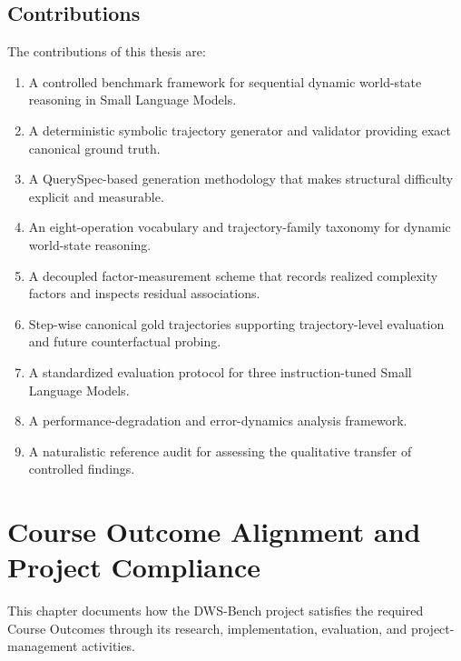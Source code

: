 \documentclass{iutbscthesis}
\begin{document}
\section{Contributions}
The contributions of this thesis are:
\begin{enumerate}
\item A controlled benchmark framework for sequential dynamic world-state reasoning in Small
Language Models.
\item A deterministic symbolic trajectory generator and validator providing exact canonical ground
truth.
\item A QuerySpec-based generation methodology that makes structural difficulty explicit and
measurable.
\item An eight-operation vocabulary and trajectory-family taxonomy for dynamic world-state reasoning.
\item A decoupled factor-measurement scheme that records realized complexity factors and inspects
residual associations.
\item Step-wise canonical gold trajectories supporting trajectory-level evaluation and future
counterfactual probing.
\item A standardized evaluation protocol for three instruction-tuned Small Language Models.
\item A performance-degradation and error-dynamics analysis framework.
\item A naturalistic reference audit for assessing the qualitative transfer of controlled findings.
\end{enumerate}

\chapter{Course Outcome Alignment and Project Compliance}
This chapter documents how the DWS-Bench project satisfies the required Course Outcomes through its research, implementation, evaluation, and project-management activities.
\end{document}
